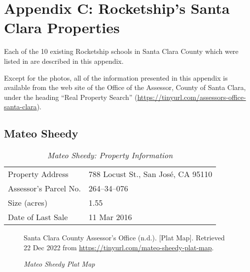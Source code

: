 
\chapter{Appendix C: Rocketship's Santa Clara Properties}\label{appx:rocketship-property-info}\indent%

Each of the 10 existing Rocketship schools in Santa Clara County which were listed in  are described in this appendix.

Except for the photos, all of the information presented in this appendix is available from the web site of the Office of the Assessor, County of Santa Clara, under the heading ``Real Property Search'' (\url{https://tinyurl.com/assessors-office-santa-clara}).

\clearpage

\section{Mateo Sheedy}\label{sec:mateo-sheedy-info}\indent

\begin{table}[htb]
  \SingleSpacing%
  \caption[Mateo Sheedy: Property Information]{\textit{Mateo Sheedy: Property Information}}%
  \label{tab:mateo-sheedy-prop-info}
  \begin{tabular}{ll}
    \toprule
    Property Address      & 788 Locust St., San José, CA 95110 \\
    Assessor's Parcel No. &  264–34–076 \\
    Size (acres)          & 1.55 \\
    Date of Last Sale     & 11 Mar 2016 \\
    \bottomrule
  \end{tabular}
\end{table}

\begin{figure}[hbtp]
  \caption[Mateo Sheedy Plat Map]{\textit{Mateo Sheedy Plat Map}}%
  \label{fig:mateo-sheedy-plat-map}
  {Santa Clara County Assessor's Office (n.d.). [Plat Map]. Retrieved 22 Dec 2022 from  \url{https://tinyurl.com/mateo-sheedy-plat-map}.}
\end{figure}

